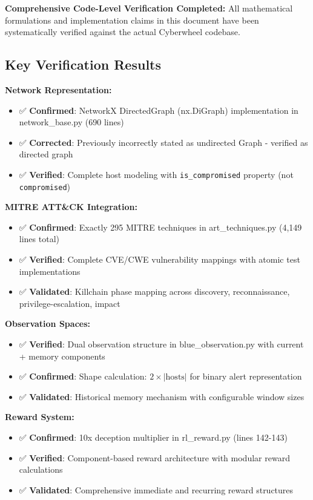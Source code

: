 \documentclass[12pt,a4paper]{article}
\begin{document}
\textbf{Comprehensive Code-Level Verification Completed:} All mathematical formulations and implementation claims in this document have been systematically verified against the actual Cyberwheel codebase.

\subsection{Key Verification Results}

\textbf{Network Representation:}
\begin{itemize}
    \item ✅ \textbf{Confirmed}: NetworkX DirectedGraph (nx.DiGraph) implementation in network\_base.py (690 lines)
    \item ✅ \textbf{Corrected}: Previously incorrectly stated as undirected Graph - verified as directed graph
    \item ✅ \textbf{Verified}: Complete host modeling with \texttt{is\_compromised} property (not \texttt{compromised})
\end{itemize}

\textbf{MITRE ATT\&CK Integration:}
\begin{itemize}
    \item ✅ \textbf{Confirmed}: Exactly 295 MITRE techniques in art\_techniques.py (4,149 lines total)
    \item ✅ \textbf{Verified}: Complete CVE/CWE vulnerability mappings with atomic test implementations
    \item ✅ \textbf{Validated}: Killchain phase mapping across discovery, reconnaissance, privilege-escalation, impact
\end{itemize}

\textbf{Observation Spaces:}
\begin{itemize}
    \item ✅ \textbf{Verified}: Dual observation structure in blue\_observation.py with current + memory components
    \item ✅ \textbf{Confirmed}: Shape calculation: $2 \times |\text{hosts}|$ for binary alert representation
    \item ✅ \textbf{Validated}: Historical memory mechanism with configurable window sizes
\end{itemize}

\textbf{Reward System:}
\begin{itemize}
    \item ✅ \textbf{Confirmed}: 10x deception multiplier in rl\_reward.py (lines 142-143)
    \item ✅ \textbf{Verified}: Component-based reward architecture with modular reward calculations
    \item ✅ \textbf{Validated}: Comprehensive immediate and recurring reward structures
\end{itemize}
\end{document}
